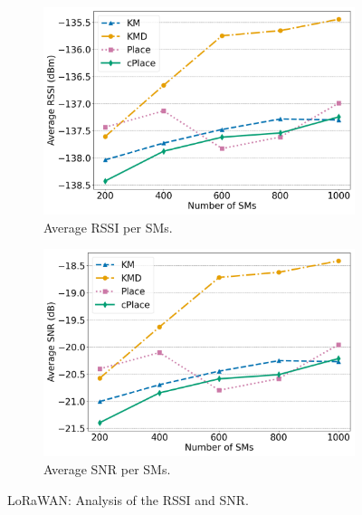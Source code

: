 \documentclass[a4paper,fleqn]{cas-dc}
\begin{document}
\begin{figure}
    \centering
    \begin{subfigure}{0.48\textwidth}
        \centering
        \includegraphics[width=\linewidth]{imgs/rssi.png}
        \caption{Average RSSI per \gls{SMs}.}
        \label{fig:rssi}
    \end{subfigure}
    \hfill
    \begin{subfigure}{0.48\textwidth}
        \centering
        \includegraphics[width=\linewidth]{imgs/snr.png}
        \caption{Average SNR per \gls{SMs}.}
        \label{fig:snr}
    \end{subfigure}
    \caption{LoRaWAN: Analysis of the RSSI and SNR.}
    \label{fig:rssi_snr}
\end{figure}
\end{document}
